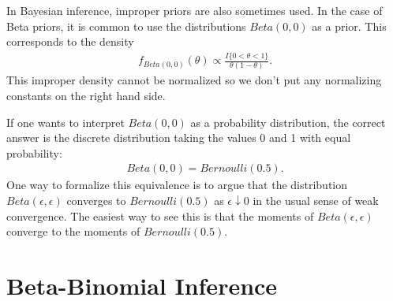 \documentclass{scrartcl}
\begin{document}
In Bayesian inference, improper priors are also sometimes used. In the
case of Beta priors, it is common to use the distributions $Beta(0,
0)$ as a prior. This corresponds to the density
\begin{align*}
  f_{Beta(0, 0)}(\theta) \propto \frac{I\{0 < \theta <
    1\}}{\theta (1 - \theta)}. 
\end{align*}
This improper density cannot be normalized so we don't put any
normalizing constants on the right hand side.

If one wants to interpret $Beta(0, 0)$ as a probability distribution,
the correct answer is the discrete distribution taking
the values 0 and 1 with equal probability:
\begin{align*}
  Beta(0, 0) = Bernoulli(0.5). 
\end{align*}
One way to formalize this equivalence is to argue that the
distribution $Beta(\epsilon, \epsilon)$ converges to $Bernoulli(0.5)$
as $\epsilon \downarrow 0$ in the usual sense of weak convergence. The
easiest way to see this is that the moments of $Beta(\epsilon,
\epsilon)$ converge to the moments of $Bernoulli(0.5)$.

\section{Beta-Binomial Inference}
\end{document}
